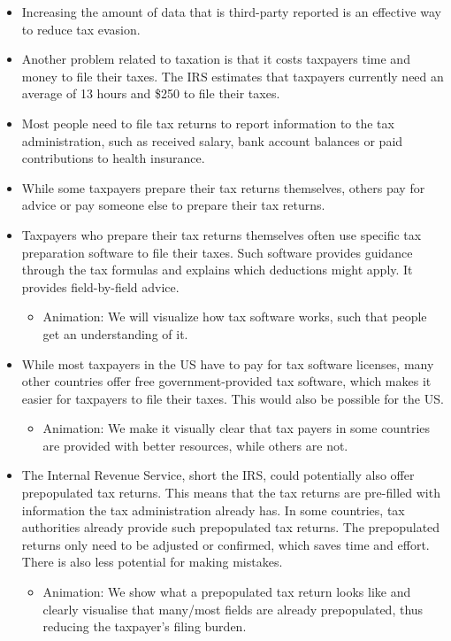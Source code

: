 \documentclass[11pt]{article}
\begin{document}
\begin{itemize}
    \item Increasing the amount of data that is third-party reported is an effective way to reduce tax evasion.
    \item Another problem related to taxation is that it costs taxpayers time and money to file their taxes. The IRS estimates that taxpayers currently need an average of 13 hours and \$250 to file their taxes.
    \item Most people need to file tax returns to report information to the tax administration, such as received salary, bank account balances or paid contributions to health insurance.
    \item While some taxpayers prepare their tax returns themselves, others pay for advice or pay someone else to prepare their tax returns.
    \item Taxpayers who prepare their tax returns themselves often use specific tax preparation software to file their taxes. Such software provides guidance through the tax formulas and explains which deductions might apply. It provides field-by-field advice.
    \begin{itemize}
        \item Animation: We will visualize how tax software works, such that people get an understanding of it. 
    \end{itemize}
    \item While most taxpayers in the US have to pay for tax software licenses, many other countries offer free government-provided tax software, which makes it easier for taxpayers to file their taxes. This would also be possible for the US. 
    \begin{itemize}
        \item Animation: We make it visually clear that tax payers in some countries are provided with better resources, while others are not. 
    \end{itemize}
    \item The Internal Revenue Service, short the IRS, could potentially also offer prepopulated tax returns. This means that the tax returns are pre-filled with information the tax administration already has. In some countries, tax authorities already provide such prepopulated tax returns. The prepopulated returns only need to be adjusted or confirmed, which saves time and effort. There is also less potential for making mistakes.
    \begin{itemize}
        \item Animation: We show what a prepopulated tax return looks like and clearly visualise that many/most fields are already prepopulated, thus reducing the taxpayer's filing burden. 

\end{itemize}
\end{itemize}
\end{document}
